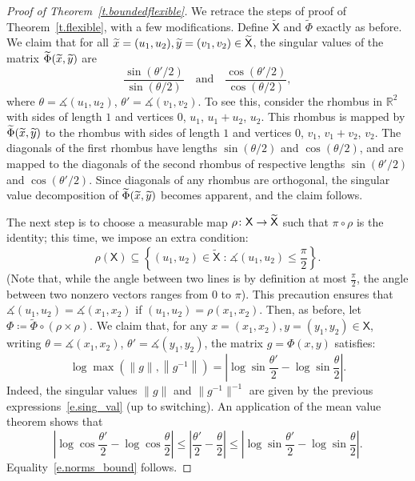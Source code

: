 \documentclass[10pt]{amsart}
\theoremstyle{definition}\newtheorem{defi}[theo]{Definition}\newtheorem{rema}[theo]{Remark}\newtheorem{exam}[theo]{Example}\newtheorem{exem}[theo]{Example}\newtheorem{nota}[theo]{Notation}
\newcommand{\R}{\mathbb{R}}
\newcommand{\sfX}{\mathsf{X}}
\newcommand{\st}{\;\mathord{:}\;}
\renewcommand{\angle}{\measuredangle}
\renewcommand*{\to}{\mathchoice{\longrightarrow}{\rightarrow}{\rightarrow}{\rightarrow}}
\let\oldtilde\tilde
\renewcommand*{\tilde}[1]{\mathchoice{\widetilde{#1}}{\widetilde{#1}}{\oldtilde{#1}}{\oldtilde{#1}}}
\begin{document}
\begin{proof}[Proof of Theorem~\ref{t.boundedflexible}]
We retrace the steps of proof of Theorem~\ref{t.flexible}, with a few modifications. Define $\widetilde{\sfX}$ and $\widetilde{\Phi}$ exactly as before. We claim that for all $\tilde{x} = (u_1,u_2), \tilde{y}=(v_1,v_2) \in \widetilde{\sfX}$, the singular values of the matrix $\widetilde{\Phi}(\tilde{x},\tilde{y})$ are
\begin{equation}\label{e.sing_val}
\frac{\sin (\theta'/2)}{\sin (\theta/2)} \quad \text{and} \quad
\frac{\cos (\theta'/2)}{\cos (\theta/2)},
\end{equation}
where $\theta = \angle(u_1,u_2)$, $\theta' = \angle(v_1,v_2)$. To see this, consider the rhombus in $\R^2$ with sides of length $1$ and vertices $0$, $u_1$, $u_1+u_2$, $u_2$. This rhombus is mapped by $\widetilde{\Phi}(\tilde{x},\tilde{y})$ to the rhombus with sides of length $1$ and vertices $0$, $v_1$, $v_1+v_2$, $v_2$. The diagonals of the first rhombus have lengths $\sin (\theta/2)$ and $\cos (\theta/2)$, and are mapped to the diagonals of the second rhombus of respective lengths $\sin (\theta'/2)$ and $\cos (\theta'/2)$. Since diagonals of any rhombus are orthogonal, the singular value decomposition of $\widetilde{\Phi}(\tilde{x},\tilde{y})$ becomes apparent, and the claim follows.

The next step is to choose a measurable map $\rho \colon \sfX \to \widetilde{\sfX}$ such that $\pi \circ \rho$ is the identity; this time, we impose an extra condition:
\begin{equation}
\rho(\sfX) \subseteq \left\{ (u_1,u_2) \in \widetilde{\sfX} \st \angle(u_1,u_2) \le \frac{\pi}{2} \right\}.
\end{equation}
(Note that, while the angle between two lines is by definition at most $\frac{\pi}{2}$, the angle between two nonzero vectors ranges from $0$ to $\pi$). This precaution ensures that $\angle(u_1,u_2) = \angle(x_1,x_2)$ if $(u_1,u_2) = \rho(x_1,x_2)$. Then, as before, let $\Phi \coloneqq \widetilde{\Phi}\circ (\rho \times \rho)$. We claim that, for any $x = (x_1,x_2), y = (y_1,y_2) \in \sfX$, writing $\theta = \angle(x_1,x_2)$, $\theta' = \angle(y_1,y_2)$, the matrix $g = \Phi(x,y)$ satisfies:
\begin{equation}\label{e.norms_bound}
\log \max \left(\|g\|, \left\|g^{-1}\right\| \right) =
\left| \log \sin \frac{\theta'}{2} - \log \sin \frac{\theta}{2} \right|.
\end{equation}
Indeed, the singular values $\|g\|$ and $\|g^{-1}\|^{-1}$ are given by the previous expressions~\eqref{e.sing_val} (up to switching). An application of the mean value theorem shows that
\begin{equation}
\left| \log \cos \frac{\theta'}{2} - \log \cos \frac{\theta}{2} \right| \le
\left| \frac{\theta'}{2} - \frac{\theta}{2} \right| \le
\left| \log \sin \frac{\theta'}{2} - \log \sin \frac{\theta}{2} \right|.
\end{equation}
Equality~\eqref{e.norms_bound} follows.


\end{proof}
\end{document}
